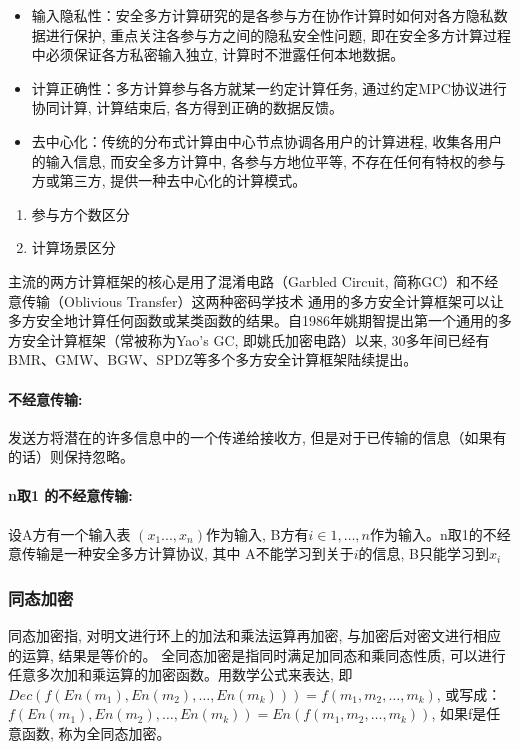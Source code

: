 \documentclass[a4paper]{article}
\begin{document}
\begin{itemize}
    \item  输入隐私性：安全多方计算研究的是各参与方在协作计算时如何对各方隐私数据进行保护, 重点关注各参与方之间的隐私安全性问题, 即在安全多方计算过程中必须保证各方私密输入独立, 计算时不泄露任何本地数据。
\item    计算正确性：多方计算参与各方就某一约定计算任务, 通过约定MPC协议进行协同计算, 计算结束后, 各方得到正确的数据反馈。
    \item     去中心化：传统的分布式计算由中心节点协调各用户的计算进程, 收集各用户的输入信息, 而安全多方计算中, 各参与方地位平等, 不存在任何有特权的参与方或第三方, 提供一种去中心化的计算模式。
\end{itemize}

\begin{enumerate}
    \item 参与方个数区分
    \item 计算场景区分
\end{enumerate}

主流的两方计算框架的核心是用了混淆电路（Garbled Circuit, 简称GC）和不经意传输（Oblivious Transfer）这两种密码学技术
通用的多方安全计算框架可以让多方安全地计算任何函数或某类函数的结果。自1986年姚期智提出第一个通用的多方安全计算框架（常被称为Yao’s GC, 即姚氏加密电路）以来, 30多年间已经有BMR、GMW、BGW、SPDZ等多个多方安全计算框架陆续提出。
\citep{GenExchsecretyao1986}
\paragraph{不经意传输:}
发送方将潜在的许多信息中的一个传递给接收方, 但是对于已传输的信息（如果有的话）则保持忽略。


\paragraph{n取1 的不经意传输:}设A方有一个输入表 $(x_1..., x_n)$作为输入, 
B方有$i \in 1,  \dots , n$作为输入。n取1的不经意传输是一种安全多方计算协议, 其中
A不能学习到关于$i$的信息, B只能学习到$x_i$
\subsubsection{同态加密}
同态加密指, 对明文进行环上的加法和乘法运算再加密, 与加密后对密文进行相应的运算, 结果是等价的。
全同态加密是指同时满足加同态和乘同态性质, 可以进行任意多次加和乘运算的加密函数。用数学公式来表达, 即$Dec(f(En(m_1), En(m_2), …, En(m_k)))=f(m_1, m_2, …, m_k)$, 或写成：$f(En(m_1), En(m_2), …, En(m_k))=En(f(m_1, m_2, …, m_k))$, 如果f是任意函数, 称为全同态加密。
\end{document}
